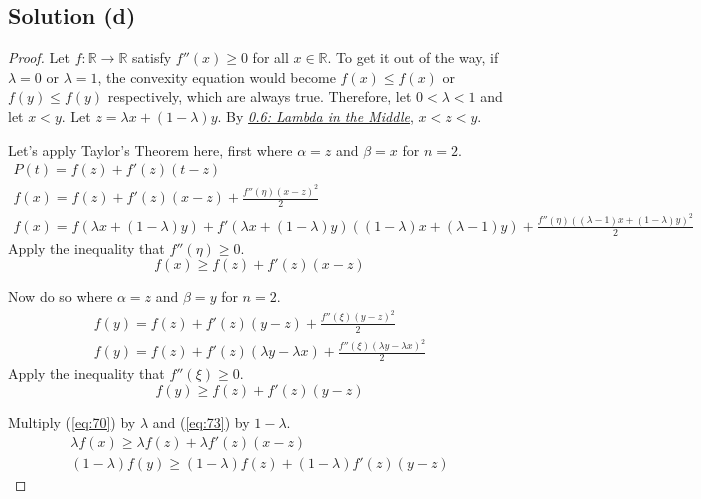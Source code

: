 \documentclass[11pt]{article}
\begin{document}
    \subsection{Solution (d)}
        \begin{proof}
            Let $f: \mathbb{R} \to \mathbb{R}$ satisfy $f''(x) \geq 0$ for all $x \in \mathbb{R}$.
            To get it out of the way, if $\lambda = 0$ or $\lambda = 1$, the convexity equation would become $f(x) \leq f(x)$ or $f(y) \leq f(y)$ respectively, which are always true.
            Therefore, let $0 < \lambda < 1$ and let $x < y$.
            Let $z = \lambda x + (1 - \lambda)y$.
            By \hyperref[thm:0.6]{\textit{0.6: Lambda in the Middle}}, $x < z < y$.

            Let's apply Taylor's Theorem here, first where $\alpha = z$ and $\beta = x$ for $n = 2$.
            \begin{gather}
                P(t) = f(z) + f'(z) (t - z)\\
                f(x) = f(z) + f'(z) (x - z) + \frac{f''(\eta) (x - z)^2}{2}\\
                f(x)   =   f(\lambda x + (1 - \lambda)y) + f'(\lambda x + (1 - \lambda)y) ((1 - \lambda) x + (\lambda - 1)y) + \frac{f''(\eta) ((\lambda - 1) x + (1 - \lambda)y)^2}{2}
            \end{gather}
            Apply the inequality that $f''(\eta) \geq 0$.
            \begin{equation}
                f(x)   \geq   f(z) + f'(z) (x - z) \label{eq:70}
            \end{equation}

            Now do so where $\alpha = z$ and $\beta = y$ for $n = 2$.
            \begin{gather}
                f(y) = f(z) + f'(z) (y - z) + \frac{f''(\xi) (y - z)^2}{2}\\
                f(y)   =   f(z) + f'(z) (\lambda y - \lambda x) + \frac{f''(\xi) (\lambda y - \lambda x)^2}{2}
            \end{gather}
            Apply the inequality that $f''(\xi) \geq 0$.
            \begin{equation}
                f(y)   \geq   f(z) + f'(z) (y - z) \label{eq:73}
            \end{equation}

            Multiply (\ref{eq:70}) by $\lambda$ and (\ref{eq:73}) by $1 - \lambda$.
            \begin{gather}
                \lambda f(x)   \geq   \lambda f(z) + \lambda f'(z) (x - z) \label{eq:74}\\
                (1 - \lambda) f(y)   \geq   (1 - \lambda) f(z) + (1 - \lambda) f'(z) (y - z) \label{eq:75}
            \end{gather}


\end{proof}
\end{document}
